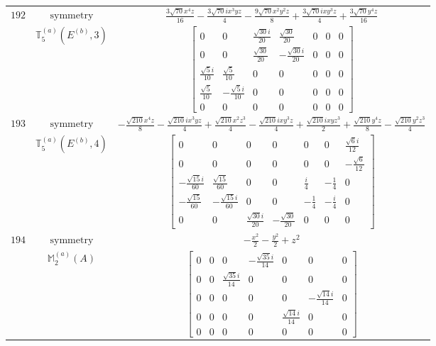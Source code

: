 \documentclass[fleqn,8pt,landscape]{jsarticle}
\begin{document}
\begin{longtable}{ccc}
$ 192 $ & $ \text{symmetry} $ & $ \frac{3 \sqrt{70} x^{4} z}{16} - \frac{3 \sqrt{70} i x^{3} y z}{4} - \frac{9 \sqrt{70} x^{2} y^{2} z}{8} + \frac{3 \sqrt{70} i x y^{3} z}{4} + \frac{3 \sqrt{70} y^{4} z}{16} $ \\
$  $ & $ \mathbb{T}_{5}^{(a)}(E^{(b)},3) $ & $ \begin{bmatrix} 0 & 0 & \frac{\sqrt{30} i}{20} & \frac{\sqrt{30}}{20} & 0 & 0 & 0 \\ 0 & 0 & \frac{\sqrt{30}}{20} & - \frac{\sqrt{30} i}{20} & 0 & 0 & 0 \\ \frac{\sqrt{5} i}{10} & \frac{\sqrt{5}}{10} & 0 & 0 & 0 & 0 & 0 \\ \frac{\sqrt{5}}{10} & - \frac{\sqrt{5} i}{10} & 0 & 0 & 0 & 0 & 0 \\ 0 & 0 & 0 & 0 & 0 & 0 & 0 \end{bmatrix} $ \\ \hline
$ 193 $ & $ \text{symmetry} $ & $ - \frac{\sqrt{210} x^{4} z}{8} - \frac{\sqrt{210} i x^{3} y z}{4} + \frac{\sqrt{210} x^{2} z^{3}}{4} - \frac{\sqrt{210} i x y^{3} z}{4} + \frac{\sqrt{210} i x y z^{3}}{2} + \frac{\sqrt{210} y^{4} z}{8} - \frac{\sqrt{210} y^{2} z^{3}}{4} $ \\
$  $ & $ \mathbb{T}_{5}^{(a)}(E^{(b)},4) $ & $ \begin{bmatrix} 0 & 0 & 0 & 0 & 0 & 0 & \frac{\sqrt{6} i}{12} \\ 0 & 0 & 0 & 0 & 0 & 0 & - \frac{\sqrt{6}}{12} \\ - \frac{\sqrt{15} i}{60} & \frac{\sqrt{15}}{60} & 0 & 0 & \frac{i}{4} & - \frac{1}{4} & 0 \\ - \frac{\sqrt{15}}{60} & - \frac{\sqrt{15} i}{60} & 0 & 0 & - \frac{1}{4} & - \frac{i}{4} & 0 \\ 0 & 0 & \frac{\sqrt{30} i}{20} & - \frac{\sqrt{30}}{20} & 0 & 0 & 0 \end{bmatrix} $ \\ \hline
$ 194 $ & $ \text{symmetry} $ & $ - \frac{x^{2}}{2} - \frac{y^{2}}{2} + z^{2} $ \\
$  $ & $ \mathbb{M}_{2}^{(a)}(A) $ & $ \begin{bmatrix} 0 & 0 & 0 & - \frac{\sqrt{35} i}{14} & 0 & 0 & 0 \\ 0 & 0 & \frac{\sqrt{35} i}{14} & 0 & 0 & 0 & 0 \\ 0 & 0 & 0 & 0 & 0 & - \frac{\sqrt{14} i}{14} & 0 \\ 0 & 0 & 0 & 0 & \frac{\sqrt{14} i}{14} & 0 & 0 \\ 0 & 0 & 0 & 0 & 0 & 0 & 0 \end{bmatrix} $ \\ \hline

\end{longtable}
\end{document}
